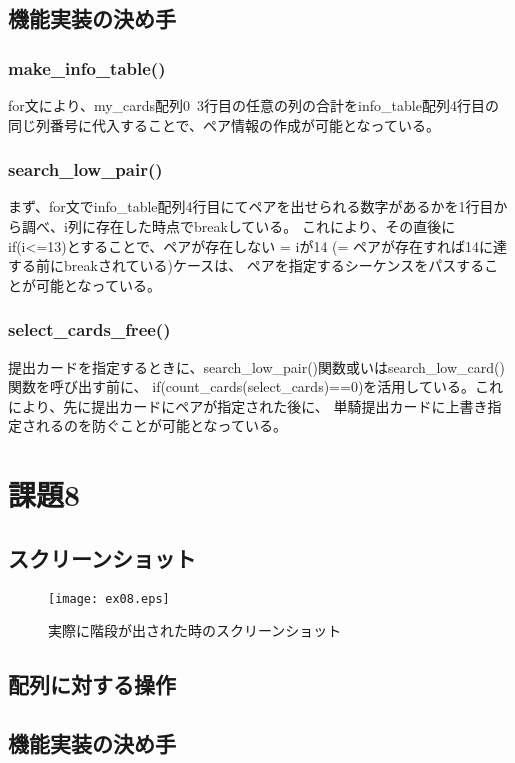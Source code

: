 \documentclass[11pt,a4paper, uplatex]{jsarticle}
\begin{document}
\subsection{機能実装の決め手}
\subsubsection{make_info_table()}
for文により、my_cards配列0~3行目の任意の列の合計をinfo_table配列4行目の同じ列番号に代入することで、ペア情報の作成が可能となっている。
\subsubsection{search_low_pair()}
まず、for文でinfo_table配列4行目にてペアを出せられる数字があるかを1行目から調べ、i列に存在した時点でbreakしている。
これにより、その直後にif(i<=13)とすることで、ペアが存在しない = iが14 (= ペアが存在すれば14に達する前にbreakされている)ケースは、
ペアを指定するシーケンスをパスすることが可能となっている。

\subsubsection{select_cards_free()}
提出カードを指定するときに、search_low_pair()関数或いはsearch_low_card()関数を呼び出す前に、
if(count_cards(select_cards)==0)を活用している。これにより、先に提出カードにペアが指定された後に、
単騎提出カードに上書き指定されるのを防ぐことが可能となっている。
\section{課題8}
\subsection{スクリーンショット}
\begin{figure}[h]
  \centering
  \caption{実際に階段が出された時のスクリーンショット}
  \texttt{[image: ex08.eps]}
\end{figure}
\subsection{配列に対する操作}
\subsection{機能実装の決め手}
%
%
\end{document}
